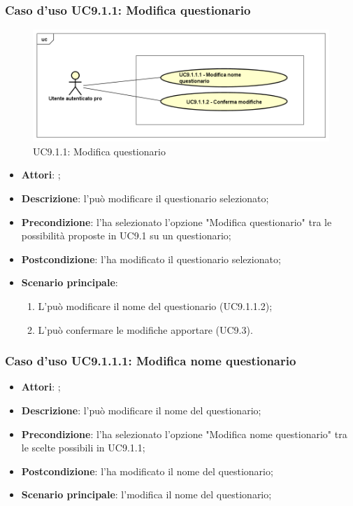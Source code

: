 			\subsubsection{Caso d'uso UC9.1.1: Modifica questionario}
			\label{UC9.1.1}
			\begin{figure}[h]
				\centering
			\includegraphics[scale=0.5,keepaspectratio]{UML/UC9_1_1.png}
				\caption{UC9.1.1: Modifica questionario}
			\end{figure}
			\FloatBarrier
			\begin{itemize}
				\item \textbf{Attori}: \uaupro;
				\item \textbf{Descrizione}: l'\uaupro può modificare il questionario selezionato;
				\item \textbf{Precondizione}: l'\uaupro ha selezionato l'opzione "Modifica questionario" tra le possibilità proposte in UC9.1 su un questionario;
				\item \textbf{Postcondizione}: l'\uaupro ha modificato il questionario selezionato; 
				\item \textbf{Scenario principale}:
					\begin{enumerate}
						\item L'\uaupro può modificare il nome del questionario (UC9.1.1.2);
						\item L'\uaupro può confermare le modifiche apportare (UC9.3).
					\end{enumerate}
			\end{itemize}
								
					\subsubsection{Caso d'uso UC9.1.1.1: Modifica nome questionario}
					\label{UC9.1.1.1}
					\begin{itemize}
						\item \textbf{Attori}: \uaupro;
						\item \textbf{Descrizione}: l'\uaupro può modificare il nome del questionario; 
						\item \textbf{Precondizione}: l'\uaupro ha selezionato l'opzione "Modifica nome questionario" tra le scelte possibili in UC9.1.1;
						\item \textbf{Postcondizione}: l'\uaupro ha modificato il nome del questionario; 
						\item \textbf{Scenario principale}: l'\uaupro modifica il nome del questionario;
					\end{itemize}
																					
